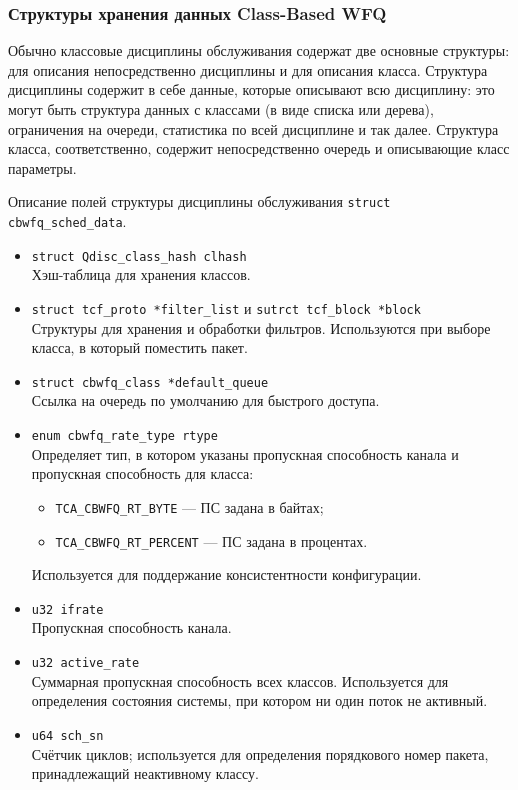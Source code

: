 		\subsubsection{Структуры хранения данных Class-Based WFQ}
	
			Обычно классовые дисциплины обслуживания содержат две основные структуры:
			для описания непосредственно дисциплины и для описания класса.  
			Структура дисциплины содержит в себе данные, которые описывают всю дисциплину:
			это могут быть структура данных с классами (в виде списка или дерева),
			ограничения на очереди, статистика по всей дисциплине и так далее.
			Структура класса, соответственно, содержит непосредственно очередь и описывающие
			класс параметры.

			Описание полей структуры дисциплины обслуживания \lstinline{struct cbwfq_sched_data}.
			\begin{itemize}
				\item \lstinline{struct Qdisc_class_hash clhash} \\
					Хэш-таблица для хранения классов. 
				\item \lstinline{struct tcf_proto *filter_list} и \lstinline{sutrct tcf_block *block}\\
					Структуры для хранения и обработки фильтров. Используются при выборе
					класса, в который поместить пакет.
				\item \lstinline{struct cbwfq_class *default_queue}\\
					Ссылка на очередь по умолчанию для быстрого доступа. 
				\item \lstinline{enum cbwfq_rate_type rtype}\\
					Определяет тип, в котором указаны пропускная способность канала
					и пропускная способность для класса:
					\begin{itemize}
						\item \lstinline{TCA_CBWFQ_RT_BYTE} --- ПС задана в байтах;
						\item \lstinline{TCA_CBWFQ_RT_PERCENT} --- ПС задана в процентах.
					\end{itemize}
					Используется для поддержание консистентности конфигурации.
				\item \lstinline{u32 ifrate} \\
					Пропускная способность канала. 
				\item \lstinline{u32 active_rate} \\
					Суммарная пропускная способность всех классов. Используется
					для определения состояния системы, при котором ни один поток не активный.
				\item \lstinline{u64 sch_sn} \\
					Счётчик циклов; используется для определения порядкового
					номер пакета, принадлежащий неактивному классу.
			\end{itemize}

